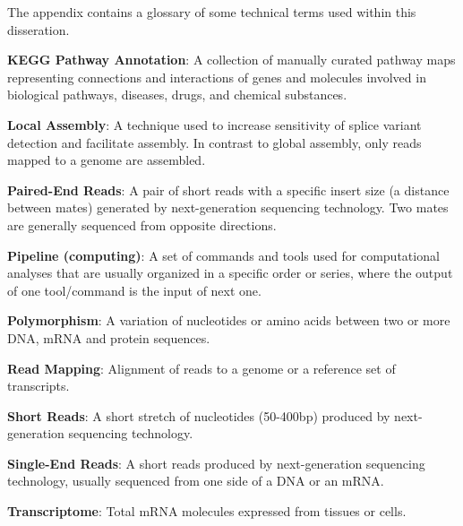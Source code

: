 The appendix contains a glossary of some technical terms used
within this disseration.


\textbf{KEGG Pathway Annotation}: A collection of manually
curated pathway maps representing connections and interactions of
genes and molecules involved in biological pathways, diseases,
drugs, and chemical substances.

\textbf{Local Assembly}: A technique used to increase sensitivity of
splice variant detection and facilitate assembly. In contrast to
global assembly, only reads mapped to a genome are assembled.

\textbf{Paired-End Reads}: A pair of short reads with a specific
insert size (a distance between mates) generated by next-generation
sequencing technology. Two mates are generally sequenced from
opposite directions.

\textbf{Pipeline (computing)}: A set of commands and tools used
for computational analyses that are usually organized in a
specific order or series, where the output of one tool/command is the
input of next one.

\textbf{Polymorphism}: A variation of nucleotides or amino acids
between two or more DNA, mRNA and protein sequences.

\textbf{Read Mapping}: Alignment of reads to a genome or a reference
set of transcripts.

\textbf{Short Reads}: A short stretch of nucleotides (50-400bp)
produced by next-generation sequencing technology.

\textbf{Single-End Reads}: A short reads produced by next-generation
sequencing technology, usually sequenced from one side of a DNA
or an mRNA.

\textbf{Transcriptome}: Total mRNA molecules expressed from
tissues or cells.
